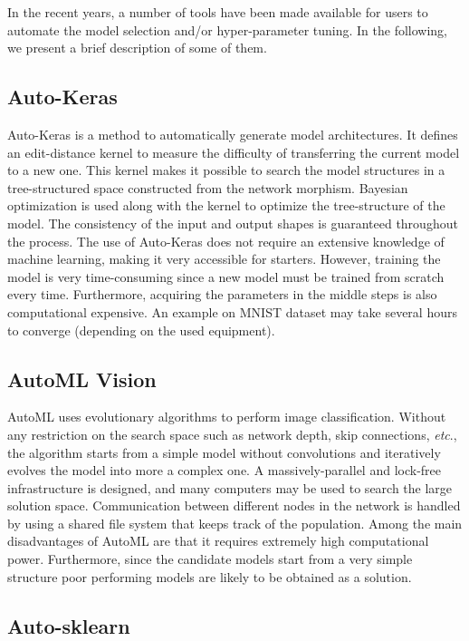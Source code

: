 \documentclass[preprint,12pt]{elsarticle}%
\begin{document}
In the recent years, a number of tools have been made available for users to automate the model selection and/or hyper-parameter tuning. In the following, we present a brief description of some of them.

\subsection{Auto-Keras}

Auto-Keras \cite{AutoKeras2018} is a method to automatically generate model architectures. It defines an edit-distance kernel to measure the difficulty of transferring the current model to a  new one. This kernel makes it possible to search the model structures in a tree-structured space constructed from the network morphism. Bayesian optimization is used along with the kernel to optimize the tree-structure of the model. The consistency of the input and output shapes is guaranteed throughout the process. The use of Auto-Keras does not require an extensive knowledge of machine learning, making it very accessible for starters. However, training the model is very time-consuming since a new model must be trained from scratch every time. Furthermore,  acquiring the parameters in the middle steps is also computational expensive. An example on MNIST dataset may take several hours to converge (depending on the used equipment).

\subsection{AutoML Vision}

AutoML \cite{AutoML2017} uses evolutionary algorithms to perform image classification. Without any restriction on the search space such as network depth, skip connections, \textit{etc}., the algorithm starts from a simple model without convolutions and iteratively evolves the model into more a complex one. A massively-parallel and lock-free infrastructure is designed, and many computers may be used to search the large solution space. Communication between different nodes in the network is handled by using a shared file system that keeps track of the population. Among the main disadvantages of AutoML are that it requires extremely high computational power. Furthermore, since the candidate models start from a very simple structure poor performing models are likely to be obtained as a solution.

\subsection{Auto-sklearn}
\end{document}
